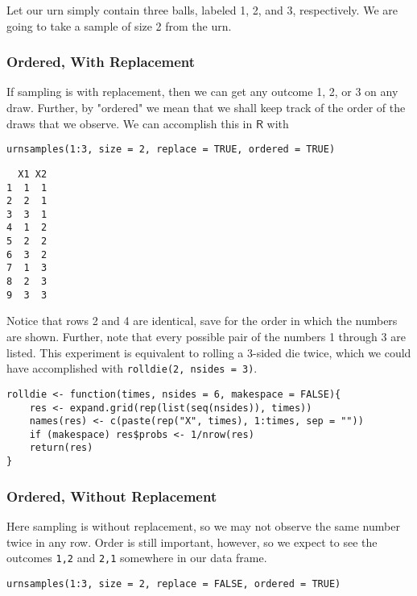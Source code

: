 \label{exa-sample-urn-two-from-three} Let our urn simply contain three
balls, labeled 1, 2, and 3, respectively. We are going to take a
sample of size 2 from the urn.

\subsubsection{Ordered, With Replacement}
\label{sec-4-1-2-2}

If sampling is with replacement, then we can get any outcome 1, 2, or
3 on any draw. Further, by "ordered" we mean that we shall keep
track of the order of the draws that we observe. We can accomplish
this in \(\mathsf{R}\) with

\begin{Verbatim}
urnsamples(1:3, size = 2, replace = TRUE, ordered = TRUE)
\end{Verbatim}

\begin{verbatim}
  X1 X2
1  1  1
2  2  1
3  3  1
4  1  2
5  2  2
6  3  2
7  1  3
8  2  3
9  3  3
\end{verbatim}

Notice that rows 2 and 4 are identical, save for the order in which
the numbers are shown. Further, note that every possible pair of the
numbers 1 through 3 are listed. This experiment is equivalent to
rolling a 3-sided die twice, which we could have accomplished with
\texttt{rolldie(2, nsides = 3)}.

\begin{Verbatim}
rolldie <- function(times, nsides = 6, makespace = FALSE){
    res <- expand.grid(rep(list(seq(nsides)), times))
    names(res) <- c(paste(rep("X", times), 1:times, sep = ""))
    if (makespace) res$probs <- 1/nrow(res)
    return(res)
}
\end{Verbatim}

\subsubsection{Ordered, Without Replacement}
\label{sec-4-1-2-3}

Here sampling is without replacement, so we may not observe the same
number twice in any row. Order is still important, however, so we
expect to see the outcomes \texttt{1,2} and \texttt{2,1} somewhere in our data
frame.

\begin{Verbatim}
urnsamples(1:3, size = 2, replace = FALSE, ordered = TRUE)
\end{Verbatim}

